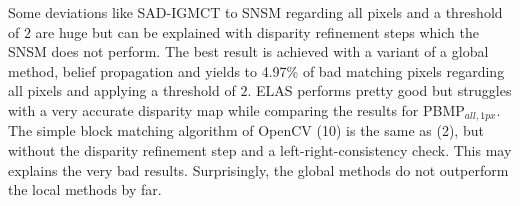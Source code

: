 \begin{table}[h!]
\centering
{}
\caption[Result table for reference dataset]{Result table for reference dataset}
\label{tab:eval:snsm:tsukuba}
\end{table}

\noindent Some deviations like SAD-IGMCT to SNSM regarding all pixels and a threshold of $2$ are huge but can be explained with disparity refinement steps which the SNSM does not perform.
The best result is achieved with a variant of a global method, belief propagation and yields to 4.97\% of bad matching pixels regarding all pixels and applying a threshold of $2$.
ELAS performs pretty good but struggles with a very accurate disparity map while comparing the results for PBMP$_{all,1px}$.
The simple block matching algorithm of OpenCV (10) is the same as (2), but without the disparity refinement step and a left-right-consistency check.
This may explains the very bad results.
Surprisingly, the global methods do not outperform the local methods by far.

